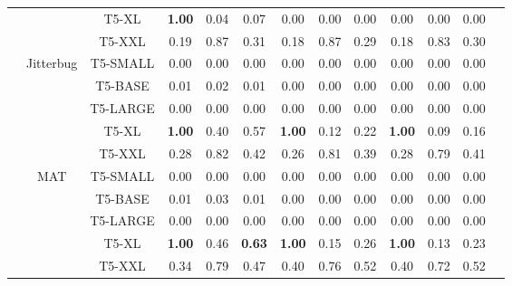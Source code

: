 \documentclass[twocolumn]{article}
\begin{document}
\begin{table}[ht!]
{\begin{tabular}{|c|c|c|ccc|ccc|ccc|c|}
& & T5-XL  & \textbf{1.00} & 0.04 & 0.07  & 0.00 & 0.00 & 0.00  & 0.00 & 0.00 & 0.00  & \\
& & T5-XXL  & 0.19 & 0.87 & 0.31  & 0.18 & 0.87 & 0.29  & 0.18 & 0.83 & 0.30  & \\
\cline{2-12}
&\multirow{5}{*}{\centering Jitterbug} & T5-SMALL  & 0.00 & 0.00 & 0.00  & 0.00 & 0.00 & 0.00  & 0.00 & 0.00 & 0.00  & \\
& & T5-BASE  & 0.01 & 0.02 & 0.01  & 0.00 & 0.00 & 0.00  & 0.00 & 0.00 & 0.00  & \\
& & T5-LARGE  & 0.00 & 0.00 & 0.00  & 0.00 & 0.00 & 0.00  & 0.00 & 0.00 & 0.00  & \\
& & T5-XL  & \textbf{1.00} & 0.40 & 0.57  & \textbf{1.00} & 0.12 & 0.22  & \textbf{1.00} & 0.09 & 0.16  & \\
& & T5-XXL  & 0.28 & 0.82 & 0.42  & 0.26 & 0.81 & 0.39  & 0.28 & 0.79 & 0.41  & \\
\cline{2-12}
&\multirow{5}{*}{\centering MAT} & T5-SMALL  & 0.00 & 0.00 & 0.00  & 0.00 & 0.00 & 0.00  & 0.00 & 0.00 & 0.00  & \\
& & T5-BASE  & 0.01 & 0.03 & 0.01  & 0.00 & 0.00 & 0.00  & 0.00 & 0.00 & 0.00  & \\
& & T5-LARGE  & 0.00 & 0.00 & 0.00  & 0.00 & 0.00 & 0.00  & 0.00 & 0.00 & 0.00  & \\
& & T5-XL  & \textbf{1.00} & 0.46 & \textbf{0.63}  & \textbf{1.00} & 0.15 & 0.26  & \textbf{1.00} & 0.13 & 0.23  & \\
& & T5-XXL  & 0.34 & 0.79 & 0.47  & 0.40 & 0.76 & 0.52  & 0.40 & 0.72 & 0.52  & \\
\hline



\end{tabular}%
}

\end{table}
\end{document}
